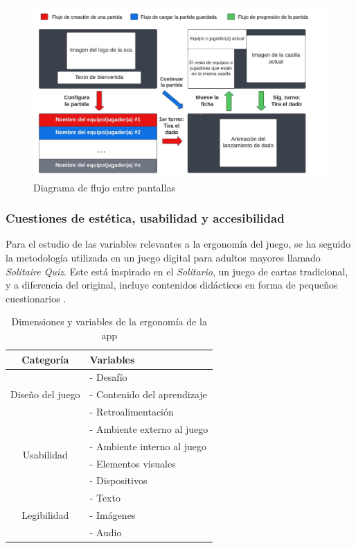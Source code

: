 \begin{figure}[H]
	\centering
	\includegraphics[width=1\textwidth]{imgs/diagrama-pantallas.jpeg}
	\caption{Diagrama de flujo entre pantallas}
	\label{fig:diagrama-pantallas}
\end{figure}

\newpage

\subsubsection{Cuestiones de estética, usabilidad y accesibilidad}

Para el estudio de las variables relevantes a la ergonomía del juego, se ha seguido la metodología utilizada en un juego digital para adultos mayores llamado \textit{Solitaire Quiz}. Este está inspirado en el \textit{Solitario}, un juego de cartas tradicional, y a diferencia del original, incluye contenidos didácticos en forma de pequeños cuestionarios \parencite{diseño2017}.

\begin{table}[H]
	\centering
	\begin{tabular}{|c|p{6cm}|}
		\hline
		\rowcolor{lightgray}
		\textbf{Categoría} & \textbf{Variables}\\
		\hline
		\multirow{3}{*}{Diseño del juego} & - Desafío \\
		& - Contenido del aprendizaje \\
		& - Retroalimentación \\
		\hline
		\multirow{4}{*}{Usabilidad} & - Ambiente externo al juego \\
		& - Ambiente interno al juego \\
		& - Elementos visuales \\
		& - Dispositivos \\
		\hline
		\multirow{3}{*}{Legibilidad} & - Texto \\
		& - Imágenes \\
		& - Audio \\
		\hline
	\end{tabular}
	\caption{Dimensiones y variables de la ergonomía de la app}
	\label{tab:usabilidad}
\end{table}

